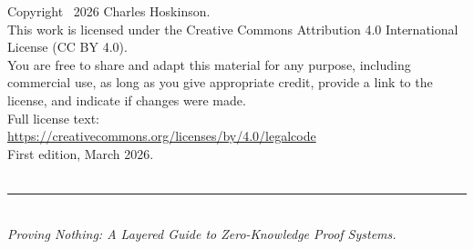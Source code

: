 
\newpage
\thispagestyle{empty}

\vspace*{\fill}

\begin{center}
\begin{minipage}{0.75\textwidth}

{\small\color{MidnightMuted}

\noindent Copyright \textcopyright\ 2026 Charles Hoskinson.\\[1.5em]

\noindent This work is licensed under the Creative Commons Attribution 4.0
International License (CC BY 4.0).\\[1em]

\noindent You are free to share and adapt this material for any purpose,
including commercial use, as long as you give appropriate credit, provide
a link to the license, and indicate if changes were made.\\[1em]

\noindent Full license text:\\
{\color{MidnightPurple}\url{https://creativecommons.org/licenses/by/4.0/legalcode}}\\[2em]

\noindent First edition, March 2026.\\[0.5em]
\\[2em]

{\color{MidnightGrey}\rule{0.3\textwidth}{0.5pt}}\\[1em]

\noindent\textit{Proving Nothing: A Layered Guide to Zero-Knowledge Proof Systems.}

}

\end{minipage}
\end{center}

\vspace*{\fill}

\newpage
